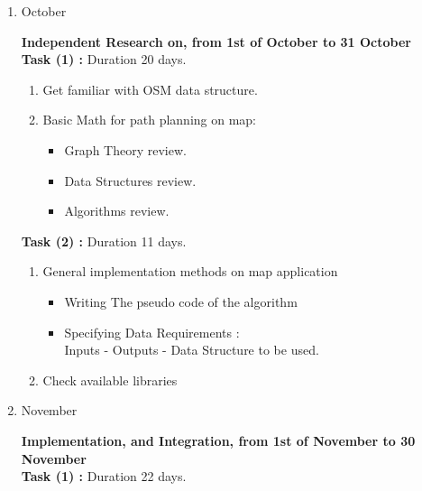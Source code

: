 \documentclass[a4paper, 12pt, english]{book}
\begin{document}
\begin{enumerate}
\item {{\Large October\par}}
\textbf{Independent Research on, from 1st of October to 31 October}\\
\textbf{Task (1) :} Duration 20 days.
\begin{enumerate}
\item {Get familiar with OSM data structure.}
\item {Basic Math for path planning on map:}
\begin{itemize}
    \item {Graph Theory review.}
    \item {Data Structures review.}
    \item {Algorithms review.} 
\end{itemize}
\end{enumerate}
\textbf{Task (2) :} Duration 11 days.
\begin{enumerate}
\item {General implementation methods on map application}
\begin{itemize}
    \item{Writing The pseudo code of the algorithm}
    \item{Specifying Data Requirements :\\
              Inputs - Outputs - Data Structure to be used.}
\end{itemize}
\item {Check available libraries}

\end{enumerate}
\item {{\Large November\par}}
\textbf{Implementation, and Integration, from 1st of November to 30 November}\\
\textbf{Task (1) :} Duration 22 days.
\begin{enumerate}


\end{enumerate}
\end{enumerate}
\end{document}
